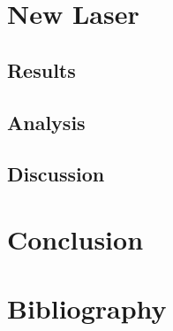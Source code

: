 \documentclass[12pt,a4paper,oneside]{report}
\begin{document}
\chapter{New Laser}

\section{Results}

\section{Analysis}

\section{Discussion}


\chapter{Conclusion}

\pagebreak
\chapter{Bibliography}
	\printbibliography[heading=none]

\pagebreak


\setcounter{page}{2}
\begin{appendices}

%
\end{appendices}
\end{document}
